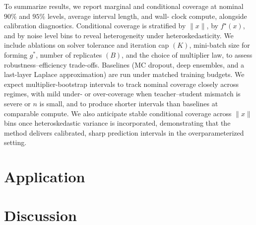 \documentclass[12pt, titlepage, reqno]{article}
\begin{document}
To summarize results, we report marginal and conditional coverage at
nominal $90\%$ and $95\%$ levels, average interval length, and wall-
clock compute, alongside calibration diagnostics. Conditional coverage
is stratified by $\|x\|$, by $f^\star(x)$, and by noise level bins to
reveal heterogeneity under heteroskedasticity. We include ablations on
solver tolerance and iteration cap $(K)$, mini-batch size for forming
$g^{*}$, number of replicates $(B)$, and the choice of multiplier law,
to assess robustness–efficiency trade-offs. Baselines (MC dropout,
deep ensembles, and a last-layer Laplace approximation) are run under
matched training budgets. We expect multiplier-bootstrap intervals to
track nominal coverage closely across regimes, with mild under- or
over-coverage when teacher–student mismatch is severe or $n$ is small,
and to produce shorter intervals than baselines at comparable compute.
We also anticipate stable conditional coverage across $\|x\|$ bins
once heteroskedastic variance is incorporated, demonstrating that the
method delivers calibrated, sharp prediction intervals in the
overparameterized setting.

\section{Application}

\section{Discussion}





	
\end{document}
